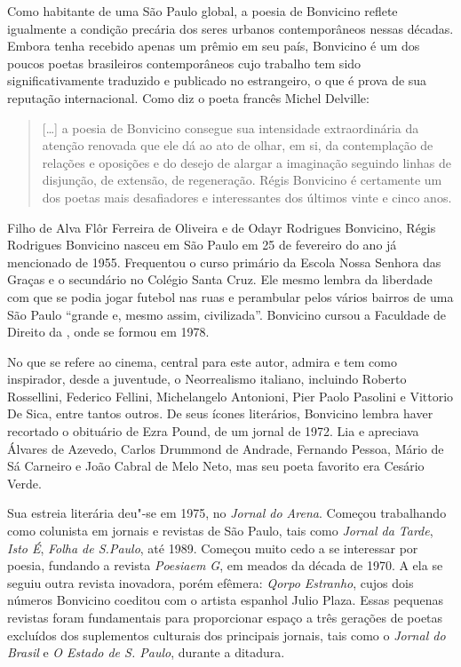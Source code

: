 Como habitante de uma São Paulo global, a poesia de Bonvicino reflete
igualmente a condição precária dos seres urbanos contemporâneos nessas
décadas. Embora tenha recebido apenas um prêmio em seu país, Bonvicino é
um dos poucos poetas brasileiros contemporâneos cujo trabalho tem sido
significativamente traduzido e publicado no estrangeiro, o que é prova
de sua reputação internacional. Como diz o poeta francês Michel
Delville:

\begin{quote}
{[}\ldots{}{]} a poesia de Bonvicino consegue sua intensidade
extraordinária da atenção renovada que ele dá ao ato de olhar, em si, da
contemplação de relações e oposições e do desejo de alargar a imaginação
seguindo linhas de disjunção, de extensão, de regeneração. Régis
Bonvicino é certamente um dos poetas mais desafiadores e interessantes
dos últimos vinte e cinco anos.
\end{quote}

Filho de Alva Flôr Ferreira de Oliveira e de Odayr Rodrigues Bonvicino,
Régis Rodrigues Bonvicino nasceu em São Paulo em 25 de fevereiro do ano
já mencionado de 1955. Frequentou o curso primário da Escola Nossa
Senhora das Graças e o secundário no Colégio Santa Cruz. Ele mesmo
lembra da liberdade com que se podia jogar futebol nas ruas e perambular
pelos vários bairros de uma São Paulo ``grande e, mesmo assim,
civilizada''. Bonvicino cursou a Faculdade de Direito da , onde se
formou em 1978.

No que se refere ao cinema, central para este autor, admira e tem como
inspirador, desde a juventude, o Neorrealismo italiano, incluindo
Roberto Rossellini, Federico Fellini, Michelangelo Antonioni, Pier Paolo
Pasolini e Vittorio De Sica, entre tantos outros. De seus ícones
literários, Bonvicino lembra haver recortado o obituário de Ezra Pound,
de um jornal de 1972. Lia e apreciava Álvares de Azevedo, Carlos
Drummond de Andrade, Fernando Pessoa, Mário de Sá Carneiro e João Cabral
de Melo Neto, mas seu poeta favorito era Cesário Verde.

Sua estreia literária deu"-se em 1975, no \emph{Jornal do Arena}. Começou
trabalhando como colunista em jornais e revistas de São Paulo, tais como
\emph{Jornal da Tarde}, \emph{Isto É}, \emph{Folha de S.Paulo}, até
1989. Começou muito cedo a se interessar por poesia, fundando a revista
\emph{Poesiaem G}, em meados da década de 1970. A ela se seguiu outra
revista inovadora, porém efêmera: \emph{Qorpo Estranho}, cujos dois
números Bonvicino coeditou com o artista espanhol Julio Plaza. Essas
pequenas revistas foram fundamentais para proporcionar espaço a três
gerações de poetas excluídos dos suplementos culturais dos principais
jornais, tais como o \emph{Jornal do Brasil} e \emph{O Estado de S.
Paulo}, durante a ditadura.

